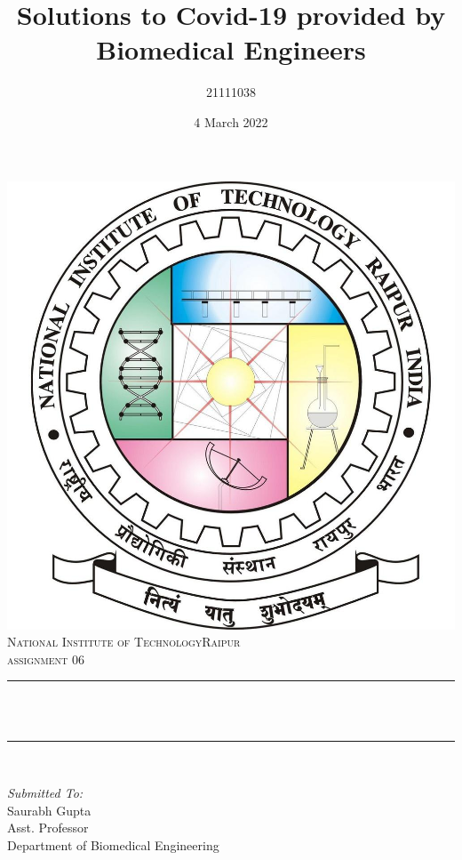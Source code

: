\documentclass[12pt]{article}
\title{Solutions to Covid-19 provided by Biomedical Engineers}								%
\author{21111038}								%
\date{4 March 2022}											%
\makeatletter
\let\thetitle\@title
\makeatother
\begin{document}

\begin{titlepage}
	\centering
    \vspace*{0.5 cm}
    \includegraphics[scale = 0.17]{logo.jpg}\\[1.0 cm]	%
    \textsc{\LARGE  National Institute of Technology\newline\newline Raipur}\\[2.0 cm]	%
	\textsc{\Large assignment 06}\\[0.5 cm]				%
	\rule{\linewidth}{0.2 mm} \\[0.4 cm]
	{ \huge \bfseries \thetitle}\\
	\rule{\linewidth}{0.2 mm} \\[1.5 cm]
	
	\begin{minipage}{0.4\textwidth}
		\begin{flushleft} \large
			\emph{Submitted To:}\\
			Saurabh Gupta\\
            Asst. Professor\\
            Department of Biomedical Engineering\\
			\end{flushleft}
			\end{minipage}~
			\begin{minipage}{0.4\textwidth}
            

\end{minipage}
\end{titlepage}
\end{document}

